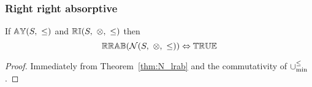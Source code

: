 \documentclass[../Summary.tex]{subfiles}
\begin{document}
\subsubsection{Right right absorptive}

\begin{theorem} \label{thm:N_rrab}
If ${\mathbb{AY}}(S,\ \leq)$ and ${\mathbb{RI}}(S,\ \otimes,\ \leq)$ then
\begin{equation*}
\propname{RRAB}(\mathcal{N}(S,\ \otimes,\ \leq)) \Leftrightarrow \propname{TRUE}
\end{equation*}
\end{theorem}


\begin{proof}

\vspace{0.5em}
Immediately from Theorem~\ref{thm:N_lrab} and the commutativity of $\mathbin{\cup_{\min}^{\leq}}$.
\end{proof}
\end{document}
